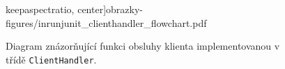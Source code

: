 \begin{figure}
keepaspectratio, center]{obrazky-figures/inrunjunit_clienthandler_flowchart.pdf}
	  \caption{Diagram znázorňující funkci obsluhy klienta implementovanou v třídě \texttt{ClientHandler}.}
	  \label{fig:clientHandler_flowchart}
	\end{figure}
	
